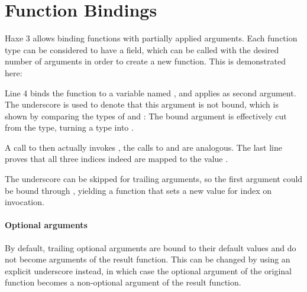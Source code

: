 \section{Function Bindings}
\label{lf-function-bindings}

Haxe 3 allows binding functions with partially applied arguments. Each function type can be considered to have a  field, which can be called with the desired number of arguments in order to create a new function. This is demonstrated here:

Line 4 binds the function  to a variable named , and applies  as second argument. The underscore \expr{_} is used to denote that this argument is not bound, which is shown by comparing the types of  and : The bound  argument is effectively cut from the type, turning a  type into .

A call to  then actually invokes , the calls to  and  are analogous. The last line proves that all three indices indeed are mapped to the value .

The underscore \expr{_} can be skipped for trailing arguments, so the first argument could be bound through , yielding a  function that sets a new value for index  on invocation.

\paragraph{Optional arguments}

By default, trailing optional arguments are bound to their default values and do not become arguments of the result function. This can be changed by using an explicit underscore \expr{_} instead, in which case the optional argument of the original function becomes a non-optional argument of the result function.




